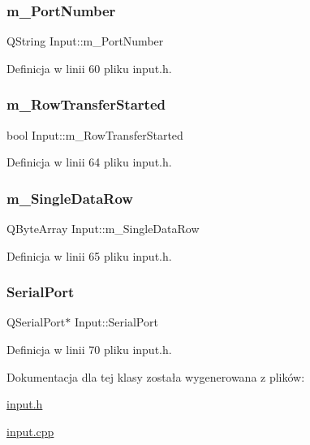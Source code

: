 \subsubsection{\texorpdfstring{m\+\_\+\+Port\+Number}{m\_PortNumber}}
{\footnotesize\ttfamily Q\+String Input\+::m\+\_\+\+Port\+Number\hspace{0.3cm}{\ttfamily [private]}}



Definicja w linii 60 pliku input.\+h.

\mbox{\label{class_input_ad80b752afa4bb13b0b042cecb36563ea}} 
\subsubsection{\texorpdfstring{m\+\_\+\+Row\+Transfer\+Started}{m\_RowTransferStarted}}
{\footnotesize\ttfamily bool Input\+::m\+\_\+\+Row\+Transfer\+Started\hspace{0.3cm}{\ttfamily [private]}}



Definicja w linii 64 pliku input.\+h.

\mbox{\label{class_input_a50f1308ea6cf70d790cef25d0ac3004f}} 
\subsubsection{\texorpdfstring{m\+\_\+\+Single\+Data\+Row}{m\_SingleDataRow}}
{\footnotesize\ttfamily Q\+Byte\+Array Input\+::m\+\_\+\+Single\+Data\+Row\hspace{0.3cm}{\ttfamily [private]}}



Definicja w linii 65 pliku input.\+h.

\mbox{\label{class_input_af21e5ac2542fa5ef2b9b9c8be740901d}} 
\subsubsection{\texorpdfstring{Serial\+Port}{SerialPort}}
{\footnotesize\ttfamily Q\+Serial\+Port$\ast$ Input\+::\+Serial\+Port}



Definicja w linii 70 pliku input.\+h.



Dokumentacja dla tej klasy została wygenerowana z plików\+:\begin{DoxyCompactItemize}
\item 
\hyperlink{input_8h}{input.\+h}\item 
\hyperlink{input_8cpp}{input.\+cpp}\end{DoxyCompactItemize}
